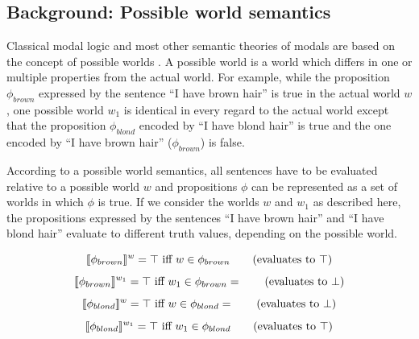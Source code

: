 \subsection{Background: Possible world semantics}

Classical modal logic and most other semantic theories of modals are based on the concept of possible worlds \cite{Kripke1963}.
A possible world is a world which differs in one or multiple properties from the actual world. For example, while the proposition $\phi_{brown}$
expressed by the  sentence ``I have brown hair'' is true in the actual world $w$, one possible world $w_1$ is identical in every regard to 
the actual world except that the proposition $\phi_{blond}$ encoded by ``I have blond hair'' is true and the one encoded by
``I have brown hair'' ($\phi_{brown}$) is false. 

According to  a possible world semantics, all sentences have to be evaluated relative to a possible world $w$ and
propositions $\phi$ can be represented as a set of worlds in which $\phi$ is true. If we consider the worlds $w$ and $w_1$ as described here,
the propositions expressed by the sentences ``I have brown hair'' and ``I have blond hair'' evaluate to different truth values, depending on the possible world.

$$\llbracket\phi_{brown}\rrbracket^w = \top \mbox{ iff } w \in \phi_{brown}  \qquad \mbox{(evaluates to $\top$)}$$
$$\llbracket\phi_{brown}\rrbracket^{w_1} = \top \mbox{ iff } w_1 \in \phi_{brown}  =  \qquad \mbox{(evaluates to $\perp$)} $$
$$\llbracket\phi_{blond}\rrbracket^{w} = \top \mbox{ iff } w \in \phi_{blond} =  \qquad \mbox{(evaluates to $\perp$)}$$
$$\llbracket\phi_{blond}\rrbracket^{w_1} = \top \mbox{ iff } w_1 \in \phi_{blond}  \qquad \mbox{(evaluates to $\top$)}$$
















